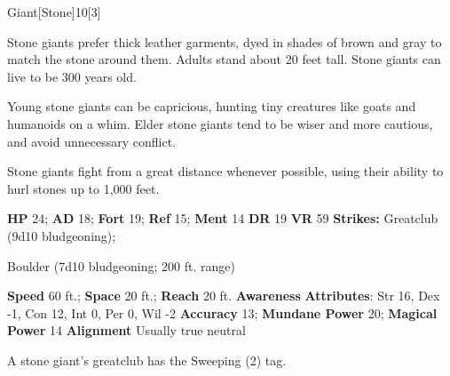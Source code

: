   \begin{monsection}{Giant}[Stone]{10}[3]
    \vspace{-1em}\vspace{-1em}
    \vspace{0em}

    
      Stone giants prefer thick leather garments, dyed in shades of brown and gray to match the stone around them. Adults stand about 20 feet tall. Stone giants can live to be 300 years old.

      Young stone giants can be capricious, hunting tiny creatures like goats and humanoids on a whim.
      Elder stone giants tend to be wiser and more cautious, and avoid unnecessary conflict.
    
      Stone giants fight from a great distance whenever possible, using their ability to hurl stones up to 1,000 feet.
    

    \begin{spellcontent}
      \begin{spelltargetinginfo}
        \pari \textbf{HP} 24;
          \textbf{AD} 18;
          \textbf{Fort} 19;
          \textbf{Ref} 15;
          \textbf{Ment} 14
        \pari \textbf{DR} 19
        \pari \textbf{VR} 59
        \pari \textbf{Strikes:}
            Greatclub  (9d10 bludgeoning);
\par Boulder  (7d10 bludgeoning; 200 ft. range)
      \end{spelltargetinginfo}
    \end{spellcontent}
    \begin{monsterfooter}
      \pari \textbf{Speed} 60 ft.;
        \textbf{Space} 20 ft.;
        \textbf{Reach} 20 ft.
      \pari \textbf{Awareness} 
      \pari \textbf{Attributes}:
        Str 16, Dex -1,
        Con 12, Int 0,
        Per 0, Wil -2
      \pari \textbf{Accuracy} 13;
        \textbf{Mundane Power} 20;
      \textbf{Magical Power} 14
      \pari \textbf{Alignment} Usually true neutral
    \end{monsterfooter}
  \end{monsection}
   A stone giant's greatclub has the Sweeping (2) tag.
  
